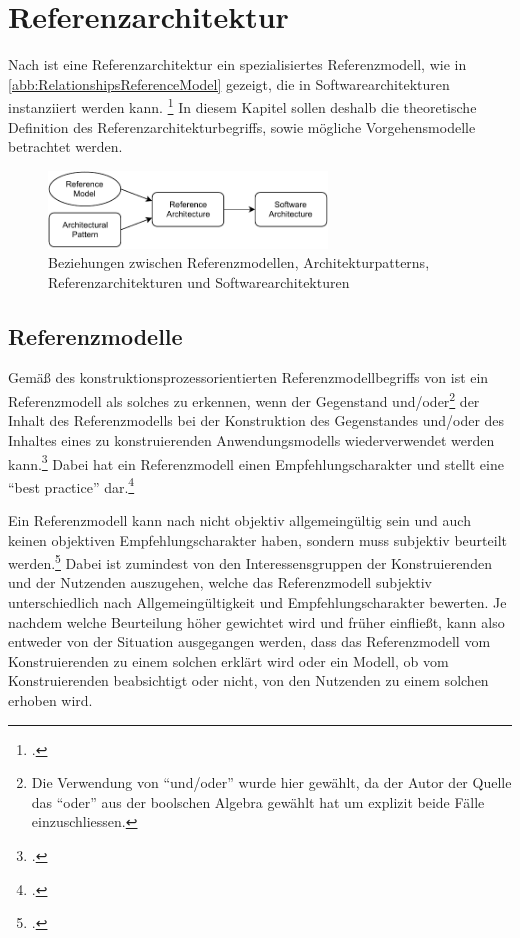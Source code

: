 \section{Referenzarchitektur}\label{theorie:referenzmodellierung}
Nach \citeauthor{Bass.2010} ist eine Referenzarchitektur ein spezialisiertes Referenzmodell, wie in \autoref{abb:RelationshipsReferenceModel} gezeigt, die in Softwarearchitekturen instanziiert werden kann. \footcite[Vgl.][S.~17~f.]{Bass.2010} In diesem Kapitel sollen deshalb die theoretische Definition des Referenzarchitekturbegriffs, sowie mögliche Vorgehensmodelle betrachtet werden.

\begin{figure}[H]
\centering
\includegraphics[width=0.66\textwidth]{graphics/Relationships-reference-models.pdf}
\caption[Beziehungen zwischen Referenzmodellen, Architekturpatterns, Referenzarchitekturen und Softwarearchitekturen]{Beziehungen zwischen Referenzmodellen, Architekturpatterns, Referenzarchitekturen und Softwarearchitekturen\footnotemark}
\label{abb:RelationshipsReferenceModel}
\end{figure}

\subsection{Referenzmodelle}\label{subsection:Referenzmodell}

Gemäß des konstruktionsprozessorientierten Referenzmodellbegriffs von \citeauthor{vomBrocke.2003} ist ein Referenzmodell als solches zu erkennen, wenn der Gegenstand und/oder\footnote{Die Verwendung von \enquote{und/oder} wurde hier gewählt, da der Autor der Quelle das \enquote{oder} aus der boolschen Algebra gewählt hat um explizit beide Fälle einzuschliessen.} der Inhalt des Referenzmodells bei der Konstruktion des Gegenstandes und/oder des Inhaltes eines zu konstruierenden Anwendungsmodells wiederverwendet werden kann.\footcite[Vgl.][34]{vomBrocke.2003} Dabei hat ein Referenzmodell einen Empfehlungscharakter und stellt eine \enquote{best practice} dar.\footcite[Vgl.][31]{vomBrocke.2003} 

Ein Referenzmodell kann nach \citeauthor{vomBrocke.2003} nicht objektiv allgemeingültig sein und auch keinen objektiven Empfehlungscharakter haben, sondern muss subjektiv beurteilt werden.\footcite[Vgl. auch im Folgenden][31~f.]{vomBrocke.2003}  Dabei ist zumindest von den Interessensgruppen der Konstruierenden und der Nutzenden auszugehen, welche das Referenzmodell subjektiv unterschiedlich nach Allgemeingültigkeit und Empfehlungscharakter bewerten. Je nachdem welche Beurteilung höher gewichtet wird und früher einfließt, kann also entweder von der Situation ausgegangen werden, dass das Referenzmodell vom Konstruierenden zu einem solchen erklärt wird oder ein Modell, ob vom Konstruierenden beabsichtigt oder nicht, von den Nutzenden zu einem solchen erhoben wird.



